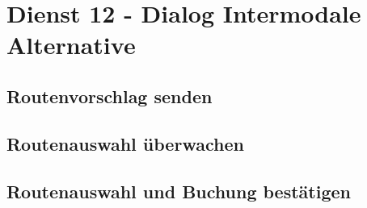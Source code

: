 \section{Dienst 12 - Dialog Intermodale Alternative}
\label{sec:Nachrichten:Dienst12}

\subsection*{Routenvorschlag senden}
\label{subsec:Nachrichten:Dienst12:ItinerarySuggestions}





\subsection*{Routenauswahl überwachen}
\label{subsec:Nachrichten:Dienst11:ItinerarySuggestionsSelectionSubscription}













\subsection*{Routenauswahl und Buchung bestätigen}
\label{subsec:Nachrichten:Dienst12:ItinerarySelectionConfirmation}




